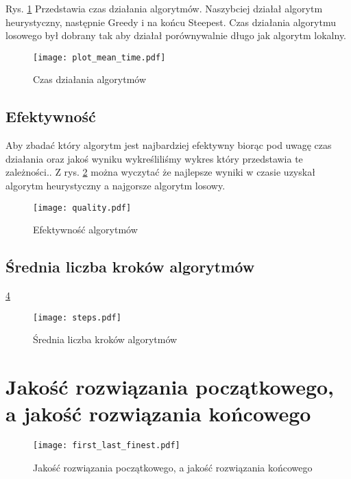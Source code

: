 \documentclass{article}
\begin{document}
Rys. \ref{fig:plot_time} Przedstawia czas działania algorytmów. Naszybciej działał algorytm heurystyczny, następnie Greedy i na końcu Steepest. Czas działania algorytmu losowego był dobrany tak aby działał porównywalnie długo jak algorytm lokalny.

\begin{figure} 
\begin{center}
    \texttt{[image: plot\_mean\_time.pdf]}
\end{center}
\caption{Czas działania algorytmów}
\label{fig:plot_time}
\end{figure}

\subsection{Efektywność}

Aby zbadać który algorytm jest najbardziej efektywny biorąc pod uwagę czas działania oraz jakoś wyniku wykreśliliśmy wykres który przedstawia te zależności.. Z rys. \ref{fig:plot_quality} można wyczytać że najlepsze wyniki w czasie uzyskał algorytm heurystyczny a najgorsze algorytm losowy.

\begin{figure} 
\begin{center}
\texttt{[image: quality.pdf]}
\end{center}
\caption{Efektywność algorytmów}
\label{fig:plot_quality}
\end{figure}

\subsection{Średnia liczba kroków algorytmów}

\ref{fig:plot_steps}

\begin{figure} 
\begin{center}
\texttt{[image: steps.pdf]}
\end{center}
\caption{Średnia liczba kroków algorytmów}
\label{fig:plot_steps}
\end{figure}

\section{Jakość rozwiązania początkowego, a jakość rozwiązania końcowego}


\begin{figure}
    \begin{center}
        \texttt{[image: first\_last\_finest.pdf]}
    \end{center}
    \caption{Jakość rozwiązania początkowego, a jakość rozwiązania końcowego}
    \label{fig:plot_steps}
\end{figure}
\end{document}

